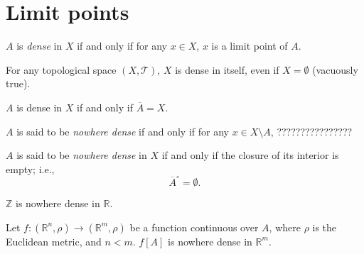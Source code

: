 \section{Limit points}


\begin{definition}
	$A$ is \textit{dense} in $X$ if and only if for any $x \in X$, $x$ is a limit point of $A$.
\end{definition}


\begin{example}
	For any topological space $(X, \mathcal T)$, $X$ is dense in itself, even if $X = \emptyset$ (vacuously true).
\end{example}


\begin{proposition}
	$A$ is dense in $X$ if and only if $\overline A = X$.
\end{proposition}


\begin{definition}
	$A$ is said to be \textit{nowhere dense} if and only if for any $x \in X \setminus A$, ????????????????
\end{definition}


\begin{definition}
	$A$ is said to be \textit{nowhere dense} in $X$ if and only if the closure of its interior is empty; i.e.,
	$$
	\overline{A}^\circ = \emptyset.
	$$
\end{definition}


\begin{example}
	$\mathbb Z$ is nowhere dense in $\mathbb R$.
\end{example}


\begin{example}
	Let $f:(\mathbb R^n, \rho) \to (\mathbb R^{m}, \rho)$ be a function continuous over $A$, where $\rho$ is the Euclidean metric, and $n < m$. $f[A]$ is nowhere dense in $\mathbb R^{m}$.
\end{example}






















%